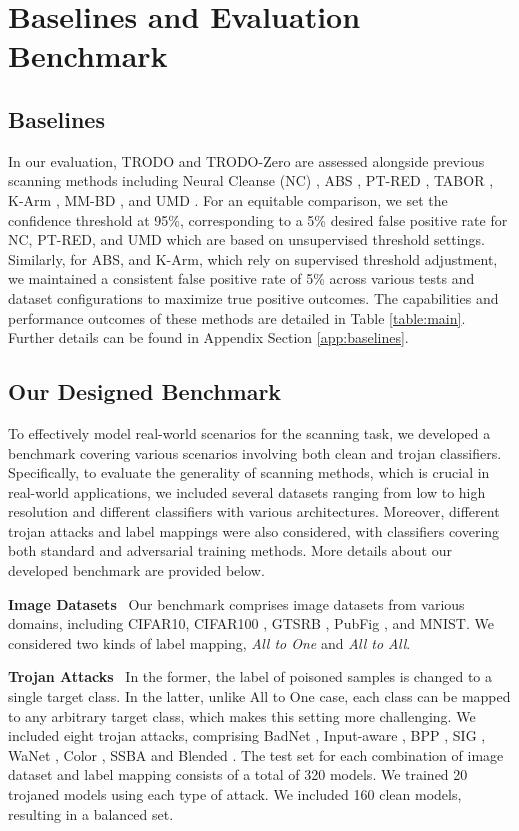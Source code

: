 \section{Baselines and Evaluation Benchmark} 
\label{sec:base_eval_bench}

\subsection{Baselines} \label{base} In our evaluation, TRODO and TRODO-Zero are assessed alongside previous scanning methods including Neural Cleanse (NC) \cite{NC}, ABS \cite{ABS}, PT-RED \cite{PTRED}, TABOR \cite{TABOR}, K-Arm \cite{kARM}, MM-BD \cite{MMBD},  and UMD \cite{umd}. For an equitable comparison, we set the confidence threshold at 95\%, corresponding to a 5\% desired false positive rate for NC, PT-RED, and UMD which are based on unsupervised threshold settings. Similarly, for ABS, and K-Arm, which rely on supervised threshold adjustment, we maintained a consistent false positive rate of 5\% across various tests and dataset configurations to maximize true positive outcomes. The capabilities and performance outcomes of these methods are detailed in Table \ref{table:main}. Further details can be found in Appendix Section \ref{app:baselines}.


\subsection{Our Designed Benchmark} \label{prop_bench}
To effectively model real-world scenarios for the scanning task, we developed a benchmark covering various scenarios involving both clean and trojan classifiers. Specifically, to evaluate the generality of scanning methods, which is crucial in real-world applications, we included several datasets ranging from low to high resolution and different classifiers with various architectures. Moreover, different trojan attacks and label mappings were also considered, with classifiers covering both standard and adversarial training methods. More details about our developed benchmark are provided below.

\textbf{Image Datasets} \ Our benchmark comprises image datasets from various domains, including CIFAR10, CIFAR100 \cite{cifar}, GTSRB \cite{gtsrb}, PubFig \cite{pubfig}, and MNIST. We considered two kinds of label mapping, \textit{All to One} and \textit{All to All}. 

\textbf{Trojan Attacks} \ In the former, the label of poisoned samples is changed to a single target class. In the latter, unlike All to One case, each class can be mapped to any arbitrary target class, which makes this setting more challenging. We included eight trojan attacks, comprising BadNet \cite{badnets}, Input-aware \cite{inputaware}, BPP \cite{bpp}, SIG \cite{sig}, WaNet \cite{wanet}, Color \cite{color}, SSBA \cite{ssba} and Blended \cite{blended}. The test set for each combination of image dataset and label mapping consists of a total of 320 models. We trained 20 trojaned models using each type of attack. We included 160 clean models, resulting in a balanced set. 

